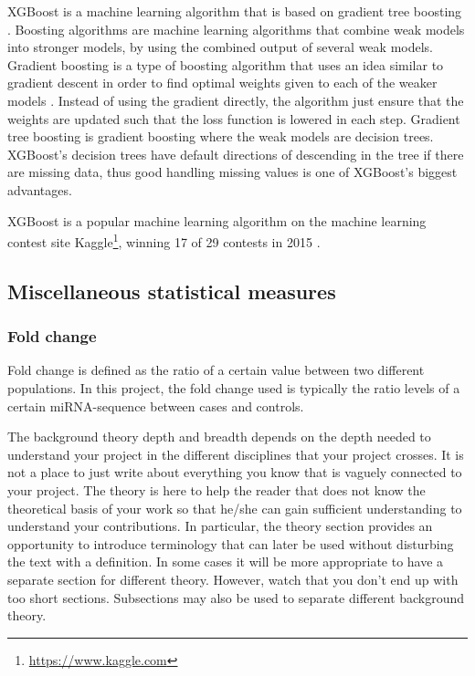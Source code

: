 XGBoost is a machine learning algorithm that is based on gradient tree boosting \citep{xgboost}. Boosting algorithms are machine learning algorithms that combine weak models into stronger models, by using the combined output of several weak models. Gradient boosting is a type of boosting algorithm that uses an idea similar to gradient descent in order to find optimal weights given to each of the weaker models \citep{gradientboosting}. Instead of using the gradient directly, the algorithm just ensure that the weights are updated such that the loss function is lowered in each step. Gradient tree boosting is gradient boosting where the weak models are decision trees. XGBoost's decision trees have default directions of descending in the tree if there are missing data, thus good handling missing values is one of XGBoost's biggest advantages.

XGBoost is a popular machine learning algorithm on the machine learning contest site Kaggle\footnote{\url{https://www.kaggle.com}}, winning 17 of 29 contests in 2015 \citep{xgboost}.

\subsection{Miscellaneous statistical measures}

\subsubsection{Fold change}
Fold change is defined as the ratio of a certain value between two different populations. In this project, the fold change used is typically the ratio levels of a certain miRNA-sequence between cases and controls. %




\iffalse
The background theory depth and breadth depends on the depth needed to understand your project in the different disciplines that your project crosses.  It is not a place to just write about everything you know that is vaguely connected to your project. The theory is here to help the reader that does not know the theoretical basis of your work so that he/she can gain sufficient understanding to understand your contributions. In particular, the theory section provides an opportunity to introduce terminology that can later be used without disturbing the text with a definition.  In some cases it will be more appropriate to have a separate section for different theory. However, watch that you don't end up with too short sections. Subsections may also be used to separate different background theory. 

